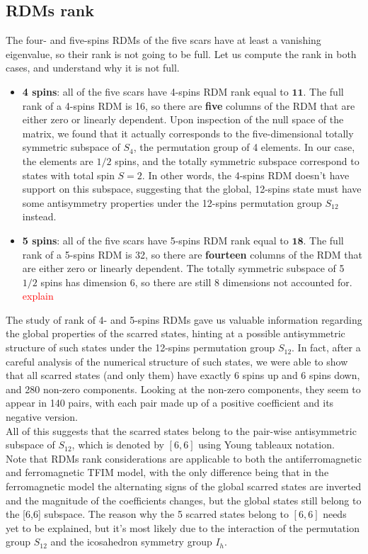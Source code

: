 \documentclass{article}
\begin{document}
\subsection{RDMs rank}

The four- and five-spins RDMs of the five scars have at least a vanishing eigenvalue, so their rank is not going to be full. Let us compute the rank in both cases, and understand why it is not full.

\begin{itemize}

\item \textbf{4 spins}: all of the five scars have 4-spins RDM rank equal to $\mathbf{11}$. The full rank of a 4-spins RDM is 16, so there are \textbf{five} columns of the RDM that are either zero or linearly dependent. Upon inspection of the null space of the matrix, we found that it actually corresponds to the five-dimensional totally symmetric subspace of $S_4$, the permutation group of 4 elements. In our case, the elements are $1/2$ spins, and the totally symmetric subspace correspond to states with total spin $S=2$. In other words, the 4-spins RDM doesn't have support on this subspace, suggesting that the global, 12-spins state must have some antisymmetry properties under the 12-spins permutation group $S_{12}$ instead.

\item \textbf{5 spins}: all of the five scars have 5-spins RDM rank equal to $\mathbf{18}$. The full rank of a 5-spins RDM is 32, so there are \textbf{fourteen} columns of the RDM that are either zero or linearly dependent. The totally symmetric subspace of 5 $1/2$ spins has dimension 6, so there are still 8 dimensions not accounted for. \textcolor{red}{explain}

\end{itemize}

The study of rank of 4- and 5-spins RDMs gave us valuable information regarding the global properties of the scarred states, hinting at a possible antisymmetric structure of such states under the 12-spins permutation group $S_{12}$. In fact, after a careful analysis of the numerical structure of such states, we were able to show that all scarred states (and only them) have exactly 6 spins up and 6 spins down, and 280 non-zero components. Looking at the non-zero components, they seem to appear in 140 pairs, with each pair made up of a positive coefficient and its negative version.\\
All of this suggests that the scarred states belong to the pair-wise antisymmetric subspace of $S_{12}$, which is denoted by $[6,6]$ using Young tableaux notation.\\
Note that RDMs rank considerations are applicable to both the antiferromagnetic and ferromagnetic TFIM model, with the only difference being that in the ferromagnetic model the alternating signs of the global scarred states are inverted and the magnitude of the coefficients changes, but the global states still belong to the [6,6] subspace.
The reason why the 5 scarred states belong to $[6,6]$ needs yet to be explained, but it's most likely due to the interaction of the permutation group $S_{12}$ and the icosahedron symmetry group $I_h$. 
 
\end{document}
